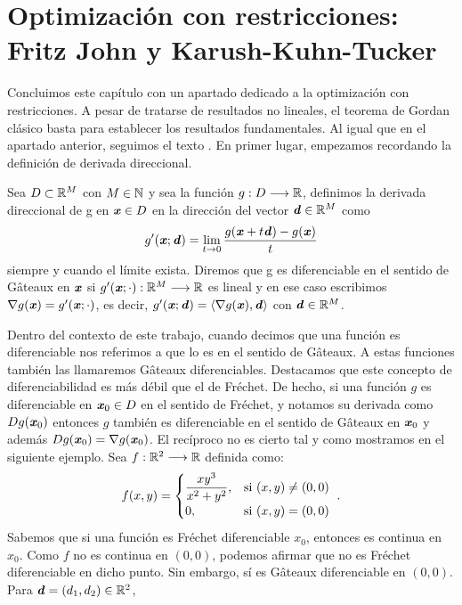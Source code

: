 \section{Optimización con restricciones: Fritz John y Karush-Kuhn-Tucker}
		\newcommand{\barx}{\bar{x} }
		\newcommand{\barxx}{\bar{\mathbf{x}}}
		\newcommand{\lambdaa}{\boldsymbol{\mathbf{\lambda}}}
		\newcommand{\dd}{\textbf{\emph{d}}}

	
Concluimos este capítulo con un apartado dedicado a la optimización con restricciones. A pesar de tratarse de resultados no lineales, el	teorema de Gordan clásico basta para establecer los resultados fundamentales. Al igual que en el apartado anterior, seguimos el texto \cite{borwein}. En primer lugar, empezamos recordando la definición de derivada direccional. 
	\begin{definicion}
			Sea $ D \subset \mathbb{R}^M $ con $ M \in \mathbb{N} $ y sea la función $ g: D \longrightarrow  \mathbb{R}$, definimos la derivada direccional de g en $\textbf{\emph{x}} \in D $ en la dirección del vector $ \dd\in \RR^M $ como
			\[
			g'(\xx;\dd) = \lim_{t\rightarrow0}\frac{g(\xx+t\dd) - g(\xx)}{t}
			\]
			siempre y cuando el límite exista. Diremos que g es diferenciable en el sentido de Gâteaux en $ \textbf{\emph{x}} $ si $ g'(\textbf{\emph{x}};\cdot):\mathbb{R}^M \longrightarrow \mathbb{R} $ es lineal y en ese caso escribimos $ \nabla g(\textbf{\emph{x}}) = g'(\textbf{\emph{x}};\cdot) $, es decir, $ g'(\xx;\dd) = \langle \nabla g(\xx), \dd\rangle $ con $ \dd \in \RR^M $.
	\end{definicion}
	
	Dentro del contexto de este trabajo, cuando decimos que una función es diferenciable nos referimos a que lo es en el sentido de Gâteaux. A estas funciones también las llamaremos Gâteaux diferenciables. Destacamos que este concepto de diferenciabilidad es más débil que el de Fréchet. De hecho, si una función $ g $ es diferenciable en $ \textbf{\emph{x}}_0 \in D$ en el sentido de Fréchet, y notamos su derivada como $ Dg(\textbf{\emph{x}}_0) $ entonces $ g $ también es diferenciable en el sentido de Gâteaux en $ \textbf{\emph{x}}_0 $ y además $ Dg(\textbf{\emph{x}}_0) = \nabla g(\textbf{\emph{x}}_0) $. El recíproco no es cierto tal y como mostramos en el siguiente ejemplo. Sea $ f:\mathbb{R}^2 \longrightarrow \mathbb{R} $ definida como:
	\[
	f(x,y) = \begin{cases}
	\displaystyle \frac{xy^3}{x^2+y^2}, & \mbox{si $ (x,y) \neq (0,0) $ } \\
	0, & \mbox{si $ (x,y) = (0,0) $ }
	\end{cases}.
	\]
	Sabemos que si una función es Fréchet diferenciable $ x_0 $, entonces es continua en $ x_0 $. Como $ f $ no es continua en $ (0,0) $, podemos afirmar que no es Fréchet diferenciable en dicho punto. Sin embargo, sí es Gâteaux diferenciable en $ (0,0) $. Para $ \dd =  (d_1, d_2) \in \RR^2 $,
	
